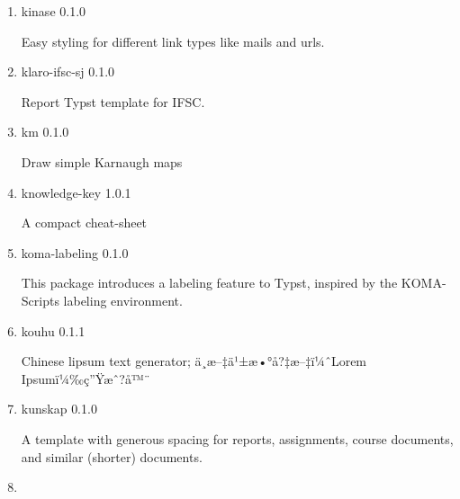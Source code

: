 \begin{enumerate}
  { keyle } { 0.2.0 }

  This package provides a simple way to style keyboard shortcuts in your
  documentation.
\item
  \href{/universe/package/kinase/}{}

  { kinase } { 0.1.0 }

  Easy styling for different link types like mails and urls.
\item
  \href{/universe/package/klaro-ifsc-sj/}{}


  { klaro-ifsc-sj } { 0.1.0 }

  Report Typst template for IFSC.
\item
  \href{/universe/package/km/}{}

  { km } { 0.1.0 }

  Draw simple Karnaugh maps
\item
  \href{/universe/package/knowledge-key/}{}


  { knowledge-key } { 1.0.1 }

  A compact cheat-sheet
\item
  \href{/universe/package/koma-labeling/}{}

  { koma-labeling } { 0.1.0 }

  This package introduces a labeling feature to Typst, inspired by the
  KOMA-Script\textquotesingle s labeling environment.
\item
  \href{/universe/package/kouhu/}{}

  { kouhu } { 0.1.1 }

  Chinese lipsum text generator; ä¸­æ--‡ä¹±æ•°å?‡æ--‡ï¼ˆLorem
  Ipsumï¼‰ç''Ÿæˆ?å™¨
\item
  \href{/universe/package/kunskap/}{}


  { kunskap } { 0.1.0 }

  A template with generous spacing for reports, assignments, course
  documents, and similar (shorter) documents.
\item
  \href{/universe/package/lambdabus/}{}


\end{enumerate}
